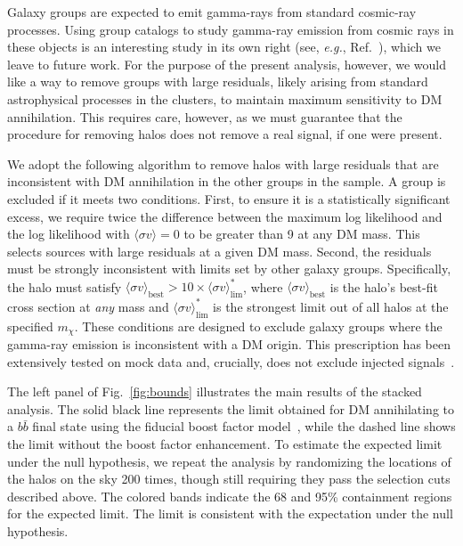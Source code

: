 Galaxy groups are expected to emit gamma-rays from standard cosmic-ray processes.  Using group catalogs to study gamma-ray emission from cosmic rays in these objects is an interesting study in its own right (see, {\it e.g.}, Ref.~\cite{Jeltema:2008vu,Huber:2013cia,Ackermann:2015fdi,Rephaeli:2015nca}), which we leave to future work.  For the purpose of the present analysis, however, we would like a way to remove groups with large residuals, likely arising from standard astrophysical processes in the clusters, to maintain maximum sensitivity to DM annihilation.  This requires care, however, as we must guarantee  that the procedure for removing halos does not remove a real signal, if one were present.  

We adopt the following algorithm to remove halos with large residuals that are inconsistent with DM annihilation in the other groups in the sample. A group is excluded if it meets two conditions. First, to ensure it is a statistically significant excess, we require twice the difference between the maximum log likelihood and the log likelihood with $\langle \sigma v \rangle = 0$ to be greater than 9 at any DM mass. This selects sources with large residuals at a given DM mass.  Second, the residuals must be strongly inconsistent with limits set by other galaxy groups. Specifically, the halo  must satisfy $\langle\sigma v\rangle_\text{best} > 10 \times \langle\sigma v\rangle^*_\text{lim}$, where $\langle\sigma v\rangle_\text{best}$ is the halo's best-fit cross section at \emph{any} mass and $\langle\sigma v\rangle^*_\text{lim}$ is the strongest limit out of all halos at the specified $m_\chi$. These conditions are designed to exclude galaxy groups where the gamma-ray emission is inconsistent with a DM origin.  This prescription has been extensively tested on mock data and, crucially, does not exclude injected signals~\cite{companion}.

  The left panel of Fig.~\ref{fig:bounds} illustrates the main results of the stacked analysis.  The solid black line represents the limit obtained for DM annihilating to a $b \bar b$ final state using the fiducial boost factor model~\cite{Bartels:2015uba}, while the dashed line  shows the limit without the boost factor enhancement.  To estimate the expected limit under the null hypothesis, we repeat the analysis by randomizing the locations of the halos on the sky 200 times, though still requiring they pass the selection cuts described above.  
The colored bands indicate the 68 and 95\% containment regions for the expected limit.  
The limit is consistent with the expectation under the null hypothesis.


